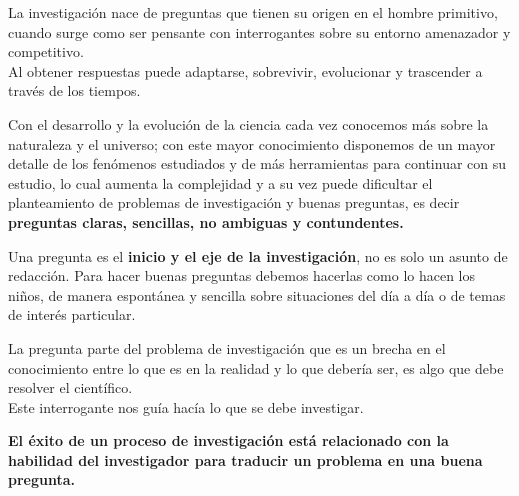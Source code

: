 \documentclass[
	11pt, %
]{beamer}
\begin{document}

\begin{frame}
  
  La investigación nace de preguntas que tienen su origen en el hombre primitivo, cuando surge como ser pensante con interrogantes sobre su entorno amenazador y competitivo.\\
  \bigskip %
  Al obtener respuestas puede adaptarse, sobrevivir, evolucionar y trascender a través de los tiempos.

  \bigskip %

  Con el desarrollo y la evolución de la ciencia cada vez conocemos más sobre la naturaleza y el universo; con este mayor conocimiento disponemos de un mayor detalle de los fenómenos estudiados y de más herramientas para continuar con su estudio, lo cual aumenta la complejidad y a su vez puede dificultar el planteamiento de problemas de investigación y buenas preguntas, es decir \textbf{preguntas claras, sencillas, no ambiguas y contundentes.}
  
  
\end{frame}

\begin{frame}
  Una pregunta es el \textbf{inicio y el eje de la investigación}, no es solo un asunto de redacción. Para hacer buenas preguntas debemos hacerlas como lo hacen los niños, de manera espontánea y sencilla sobre situaciones del día a día o de temas de interés particular.\\

  \bigskip %
  
  La pregunta parte del problema de investigación que es un brecha en el conocimiento entre lo que es en la realidad y lo que debería ser, es algo que debe resolver el científico.\\
  Este interrogante nos guía hacía lo que se debe investigar.\\
  \bigskip %
  
  \textbf{El éxito de un proceso de investigación está relacionado con la habilidad del investigador para traducir un problema en una buena pregunta.}

\end{frame}
\end{document}

